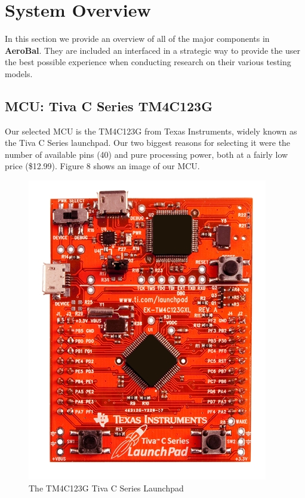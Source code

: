 \section{System Overview}
		In this section we provide an overview of all of the major components in \textbf{AeroBal}. They are included an interfaced in a strategic way to provide the user the best possible experience when conducting research on their various testing models.
		
		\subsection{MCU: Tiva C Series TM4C123G}
		
		Our selected MCU is the TM4C123G from Texas Instruments, widely known as the Tiva C Series launchpad. Our two biggest reasons for selecting it were the number of available pins (40) and pure processing power, both at a fairly low price (\$12.99). Figure 8 shows an image of our MCU.
		
		\begin{figure}[H]
			\centering
				\includegraphics[scale=2.0]{img/tivaCSeriesPNG}
			\caption{The TM4C123G Tiva C Series Launchpad}
		\end{figure}
		
